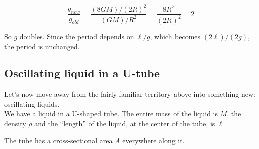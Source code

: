 \begin{equation}
\frac{g_{new}}{g_{old}} = \frac{(8 GM)/(2R)^2}{(G M)/R^2} = \frac{8R^2}{(2R)^2} = 2
\end{equation}

So $g$ doubles. Since the period depends on $\ell/g$, which becomes $(2\ell)/(2g)$, the period is unchanged.

\subsection{Oscillating liquid in a U-tube}

Let's now move away from the fairly familiar territory above into something new: oscillating liquids.\\
We have a liquid in a U-shaped tube. The entire mass of the liquid is $M$, the density $\rho$ and the ``length'' of the liquid, at the center of the tube, is $\ell$.

The tube has a cross-sectional area $A$ everywhere along it.

